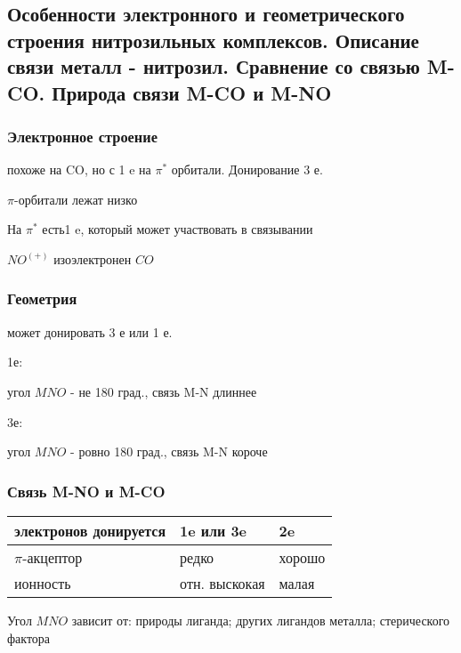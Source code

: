 \subsection{Особенности электронного и геометрического строения нитрозильных комплексов. Описание связи металл - нитрозил. Сравнение со связью M-CO. Природа связи M-CO и M-NO}

\subsubsection*{Электронное строение} похоже на CO, но с 1 e на $\pi^*$ орбитали. Донирование 3 е.

$\pi$-орбитали лежат низко

На $\pi^*$ есть1 e, который может участвовать в связывании

$NO^(+)$ изоэлектронен $CO$



\subsubsection*{Геометрия}
 может донировать 3 е или 1 е.

1е: 

угол $MNO$ - не 180 град., связь M-N длиннее

3е:

угол $MNO$ - ровно 180 град., связь M-N короче


\subsubsection*{Связь M-NO и M-CO}

\begin{tabular}{|l|l|l|}
	\hline
	электронов донируется & 1e или 3e & 2e\\
	\hline
	$\pi$-акцептор & редко & хорошо\\
	\hline
	ионность & отн. выскокая & малая\\
	\hline
\end{tabular}


Угол $MNO$ зависит от: природы лиганда; других лигандов металла; стерического фактора

